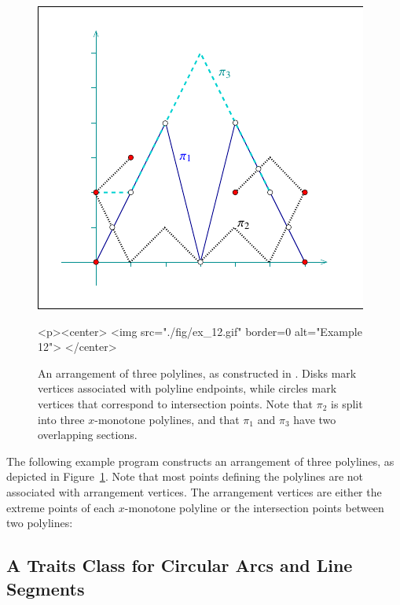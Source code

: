 \begin{figure}[t]
\begin{ccTexOnly}
  \begin{center}
  \includegraphics{Arrangement_2/fig/ex_12}
  \end{center}
\end{ccTexOnly}
\begin{ccHtmlOnly}
  <p><center>
  <img src="./fig/ex_12.gif" border=0 alt="Example 12">
  </center>
\end{ccHtmlOnly}
\caption{An arrangement of three polylines, as constructed in
. Disks mark vertices associated with
polyline endpoints, while circles mark vertices that correspond
to intersection points. Note that $\pi_2$ is split into three
$x$-monotone polylines, and that $\pi_1$ and $\pi_3$ have two
overlapping sections.\label{arr_fig:ex_12}}
\end{figure}

The following example program constructs an arrangement of three
polylines, as depicted in Figure~\ref{arr_fig:ex_12}. Note that
most points defining the polylines are not associated with arrangement
vertices. The arrangement vertices are either the extreme points of
each $x$-monotone polyline or the intersection points between two
polylines:


\subsection{A Traits Class for Circular Arcs and Line Segments\label{arr_ssec:tr_circ_seg}}

